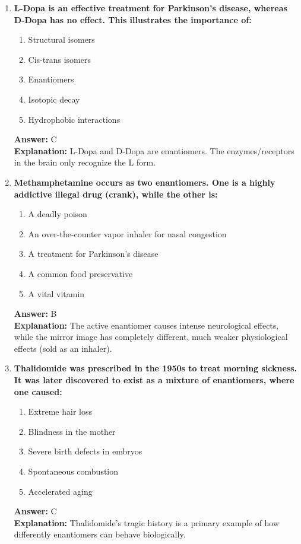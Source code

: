 \documentclass[11pt, a4paper]{article}
\begin{document}
\begin{enumerate}
\item \textbf{L-Dopa is an effective treatment for Parkinson's disease, whereas D-Dopa has no effect. This illustrates the importance of:}
\begin{enumerate}[label=\Alph*.]
    \item Structural isomers
    \item Cis-trans isomers
    \item Enantiomers
    \item Isotopic decay
    \item Hydrophobic interactions
\end{enumerate}
\textbf{Answer:} C \\
\textbf{Explanation:} L-Dopa and D-Dopa are enantiomers. The enzymes/receptors in the brain only recognize the L form.

\item \textbf{Methamphetamine occurs as two enantiomers. One is a highly addictive illegal drug (crank), while the other is:}
\begin{enumerate}[label=\Alph*.]
    \item A deadly poison
    \item An over-the-counter vapor inhaler for nasal congestion
    \item A treatment for Parkinson's disease
    \item A common food preservative
    \item A vital vitamin
\end{enumerate}
\textbf{Answer:} B \\
\textbf{Explanation:} The active enantiomer causes intense neurological effects, while the mirror image has completely different, much weaker physiological effects (sold as an inhaler).

\item \textbf{Thalidomide was prescribed in the 1950s to treat morning sickness. It was later discovered to exist as a mixture of enantiomers, where one caused:}
\begin{enumerate}[label=\Alph*.]
    \item Extreme hair loss
    \item Blindness in the mother
    \item Severe birth defects in embryos
    \item Spontaneous combustion
    \item Accelerated aging
\end{enumerate}
\textbf{Answer:} C \\
\textbf{Explanation:} Thalidomide's tragic history is a primary example of how differently enantiomers can behave biologically.


\end{enumerate}
\end{document}

